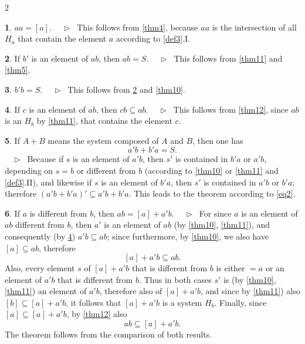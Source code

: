 \documentclass[leqno,hidelinks,10pt]{article}
\theoremstyle{definition}
\newtheorem{satz}{\protect\satzname}
\newcommand{\satzname}{}
\renewcommand{\satzname}{\hspace{-4pt}.\ Satz}%
\renewcommand{\satzname}{\hspace{-4pt}.\ Theorem}%
\newcommand\Beweis{\medskip \newline $ \phantom{'.'} \rhd \ $}%
\newcommand\beweis{ $ \phantom{'.'} \rhd \ $}%
\newcommand{\partof}{\subseteq}
\newcommand{\sref}[1]{\underline{\ref{#1}}}%
\begin{document}
\begin{paracol}{2}
\begin{rightcolumn}
\begin{satz}\label{thm13}
$aa = [a]$.
\Beweis
This follows from \sref{thm4}, because $aa$ is the intersection of all $H_a$
that contain the element $a$ according to \sref{def3}.I.
\end{satz}

\begin{satz}\label{thm14}
If $b'$ is an element of $ab$, then $ab = S$.
\Beweis
This follows from \sref{thm11} and \sref{thm5}.
\end{satz}

\begin{satz}\label{thm15}
$b' b = S$.
\Beweis
This follows from \sref{thm14} and \sref{thm10}.
\end{satz}

\begin{satz}\label{thm16}
If $c$ is an element of $ab$, then $cb \partof ab$.
\Beweis
This follows from \sref{thm12}, since $ab$ is an $H_b$ by \sref{thm11}, that
contains the element $c$.
\end{satz}

\begin{satz}\label{thm17}
If $A + B$ means the system composed of $A$ and $B$, then one has
\[
    a'b + b'a = S.
\]%
\beweis
Because if $s$ is an element of $a'b$, then $s'$ is contained in $b'a$ or $a'b$,
depending on $s = b$ or different from $b$ (according to \sref{thm10} or
\sref{thm11} and \sref{def3}.II), and likewise if $s$ is an element of $b'a$,
then $s'$ is contained in $a'b$ or $b'a$; therefore $(a'b + b'a)' \partof a'b + b'a$.
This leads to the theorem according to \eqref{eq2}.
\end{satz}

\begin{satz}\label{thm18}
If $a$ is different from $b$, then $ab = [a] + a'b$.
\Beweis
For since $a$ is an element of $ab$ different from $b$, then $a'$ is an element
of $ab$ (by \sref{thm10}, \sref{thm11}), and consequently (by \sref{thm16})
$a'b \partof ab$; since furthermore, by \sref{thm10}, we also have $[a]
\partof ab$, therefore
\[
    [a] + a'b \partof ab.
\]
Also, every element $s$ of $[a] + a'b$ that is different from $b$ is either
$= a$ or an element of $a'b$ that is different from $b$. Thus in both cases $s'$
is (by \sref{thm10}, \sref{thm11}) an element of $a'b$, therefore also of
$[a]+ a'b$, and since by \sref{thm11}) also $[b] \partof [a] + a'b$, it follows
that $[a] + a'b$ is a system $H_b$. Finally, since $[a] \partof [a] + a'b$, by
\sref{thm12} also
\[
    ab \partof [a] + a' b.
\]
The theorem follows from the comparison of both results.
\end{satz}


\end{rightcolumn}
\end{paracol}
\end{document}
